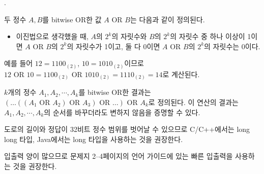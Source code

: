 \begin{problem}{\probno{}. \probtitle{}}
\begin{itemize}[topsep=0pt,noitemsep]
\end{itemize}

\Example

\begin{example}
\end{example}



\Notes

두 정수 $A, B$를 bitwise OR한 값 $A \text{ OR } B$는 다음과 같이 정의된다.
\begin{itemize}[topsep=0pt,noitemsep]
    \item 이진법으로 생각했을 때, $A$의 $2^k$의 자릿수와 $B$의 $2^k$의 자릿수 중 하나 이상이 1이면 $A \text{ OR } B$의 $2^k$의 자릿수가 1이고, 둘 다 0이면 $A \text{ OR } B$의 $2^k$의 자릿수는 0이다.
\end{itemize}


예를 들어 $12 = 1100_{(2)}$, $10 = 1010_{(2)}$이므로 $12 \text{ OR } 10 = 1100_{(2)} \text{ OR } 1010_{(2)} = 1110_{(2)} = 14$로 계산된다.

$k$개의 정수 $A_1, A_2, \cdots, A_k$를 bitwise OR한 결과는 $(\ldots((A_1 \text{ OR } A_2) \text{ OR } A_3) \text{ OR } \ldots) \text{ OR } A_k$로 정의된다. 이 연산의 결과는 $A_1, A_2, \cdots, A_k$의 순서를 바꾸더라도 변하지 않음을 증명할 수 있다.

도로의 길이와 정답이 32비트 정수 범위를 벗어날 수 있으므로 C/C++에서는 long long 타입, Java에서는 long 타입을 사용하는 것을 권장한다.

입출력 양이 많으므로 문제지 2--4페이지의 언어 가이드에 있는 빠른 입출력을 사용하는 것을 권장한다.

\end{problem}